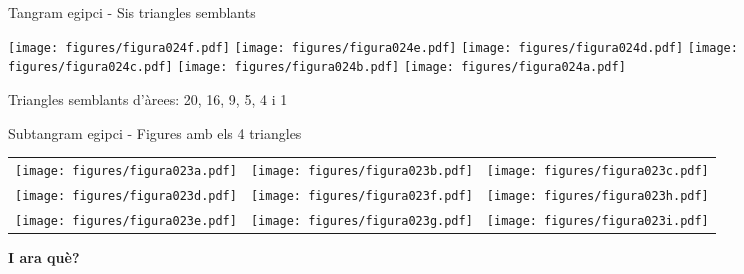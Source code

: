 \documentclass[14pt]{beamer}
\begin{document}
    \begin{frame}{Tangram egipci - Sis triangles semblants}
        \begin{center}
            \texttt{[image: figures/figura024f.pdf]}\quad
            \texttt{[image: figures/figura024e.pdf]}\quad
            \texttt{[image: figures/figura024d.pdf]}\quad
            \texttt{[image: figures/figura024c.pdf]}\quad
            \texttt{[image: figures/figura024b.pdf]}\quad
            \texttt{[image: figures/figura024a.pdf]}\\

            \bigskip

            Triangles semblants d'àrees: 20, 16, 9, 5, 4 i 1
        \end{center}
    \end{frame}
    
    \begin{frame}{Subtangram egipci - Figures amb els 4 triangles}
            \begin{center}
                \begin{tabular}{ccc}
                    \texttt{[image: figures/figura023a.pdf]} &
                    \texttt{[image: figures/figura023b.pdf]} &
                    \texttt{[image: figures/figura023c.pdf]} \\[3ex]
                    \texttt{[image: figures/figura023d.pdf]} &
                    \texttt{[image: figures/figura023f.pdf]} &
                    \texttt{[image: figures/figura023h.pdf]} \\[2ex]
                    \texttt{[image: figures/figura023e.pdf]} &
                    \texttt{[image: figures/figura023g.pdf]} &
                    \texttt{[image: figures/figura023i.pdf]} \\
                \end{tabular}
            \end{center}
    \end{frame}


    \begin{frame}{}
        \begin{center}
            \textbf{\Huge I ara què?}\\
        \end{center}
    \end{frame}
\end{document}
